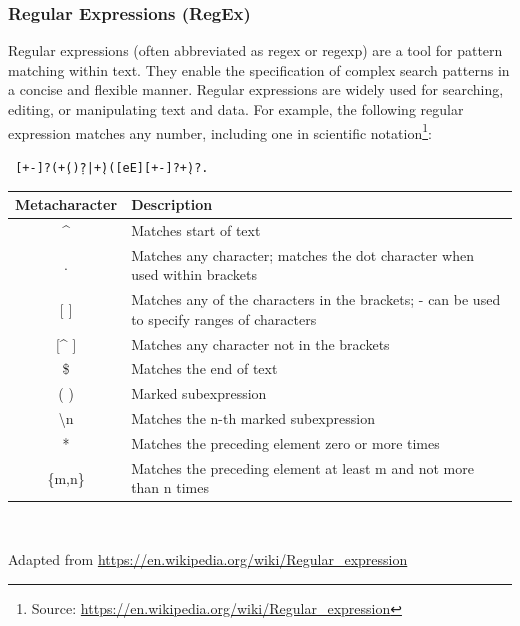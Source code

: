 \begin{advanced}
\subsubsection*{Regular Expressions (RegEx)}

Regular expressions (often abbreviated as regex or regexp) are a tool for pattern matching within text. They enable the specification of complex search patterns in a concise and flexible manner. Regular expressions are widely used for searching, editing, or manipulating text and data. For example, the following regular expression matches any number, including one in scientific notation\footnote{Source: \url{https://en.wikipedia.org/wiki/Regular\_expression}}:

\noindent \texttt{
[+-]?(\d+(\.\d*)?|\.\d+)([eE][+-]?\d+)?.}

\begin{table}[h]
\small
\centering

\renewcommand{\arraystretch}{1.25}
\begin{tabularx}{\textwidth}{c|X} \hline
{\bf Metacharacter} & {\bf Description} \\ \hline \hline
\^{ } & Matches start of text \\ \hline
. & Matches any character; matches the dot character when used within brackets \\ \hline
$[$ $]$ & Matches any of the characters in the brackets; - can be used to specify ranges of characters \\ \hline
$[$\^{ } $]$ & Matches any character not in the brackets \\ \hline
\$ & Matches the end of text \\ \hline
( ) & Marked subexpression \\ \hline
\textbackslash n & Matches the n-th marked subexpression \\ \hline
* & Matches the preceding element zero or more times \\ \hline
\{m,n\} & Matches the preceding element at least m and not more than n times \\ \hline
\end{tabularx} \\
\vspace{.5\baselineskip}

{\footnotesize Adapted from \url{https://en.wikipedia.org/wiki/Regular_expression}} 


\end{table}
\end{advanced}
